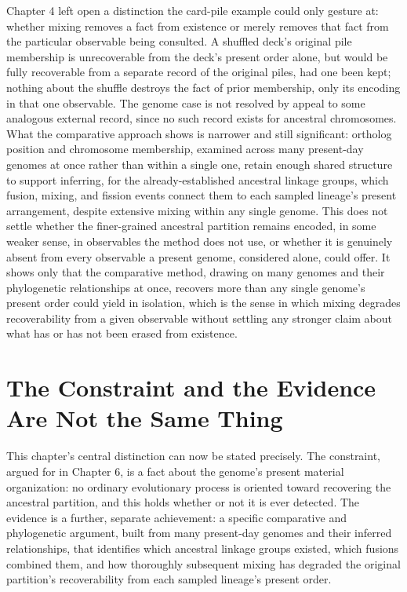 \documentclass[11pt]{book}
\begin{document}
Chapter 4 left open a distinction the card-pile example could only gesture at: whether mixing removes a fact from existence or merely removes that fact from the particular observable being consulted. A shuffled deck's original pile membership is unrecoverable from the deck's present order alone, but would be fully recoverable from a separate record of the original piles, had one been kept; nothing about the shuffle destroys the fact of prior membership, only its encoding in that one observable. The genome case is not resolved by appeal to some analogous external record, since no such record exists for ancestral chromosomes. What the comparative approach shows is narrower and still significant: ortholog position and chromosome membership, examined across many present-day genomes at once rather than within a single one, retain enough shared structure to support inferring, for the already-established ancestral linkage groups, which fusion, mixing, and fission events connect them to each sampled lineage's present arrangement, despite extensive mixing within any single genome. This does not settle whether the finer-grained ancestral partition remains encoded, in some weaker sense, in observables the method does not use, or whether it is genuinely absent from every observable a present genome, considered alone, could offer. It shows only that the comparative method, drawing on many genomes and their phylogenetic relationships at once, recovers more than any single genome's present order could yield in isolation, which is the sense in which mixing degrades recoverability from a given observable without settling any stronger claim about what has or has not been erased from existence.

\section{The Constraint and the Evidence Are Not the Same Thing}

This chapter's central distinction can now be stated precisely. The constraint, argued for in Chapter 6, is a fact about the genome's present material organization: no ordinary evolutionary process is oriented toward recovering the ancestral partition, and this holds whether or not it is ever detected. The evidence is a further, separate achievement: a specific comparative and phylogenetic argument, built from many present-day genomes and their inferred relationships, that identifies which ancestral linkage groups existed, which fusions combined them, and how thoroughly subsequent mixing has degraded the original partition's recoverability from each sampled lineage's present order.
\end{document}
